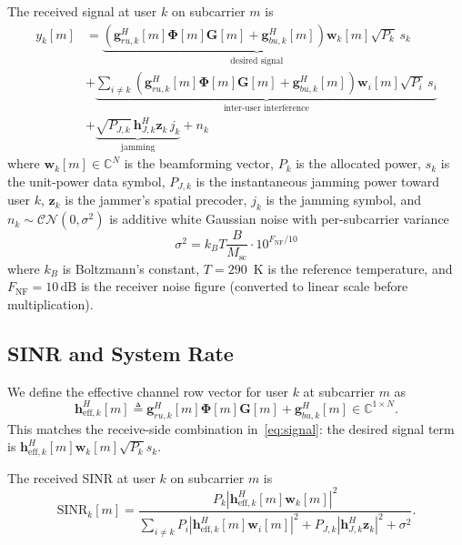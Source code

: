 \documentclass[journal,twocolumn]{IEEEtran}
\newcommand{\vect}[1]{\mathbf{#1}}
\newcommand{\mat}[1]{\mathbf{#1}}
\newcommand{\C}{\mathbb{C}}
\begin{document}
The received signal at user $k$ on subcarrier $m$ is
\begin{align}
y_k[m] &= \underbrace{\left(\vect{g}_{ru,k}^H[m]\bm{\Phi}[m]\mat{G}[m] + \vect{g}_{bu,k}^H[m]\right)\vect{w}_k[m]\sqrt{P_k}\,s_k}_{\text{desired signal}} \nonumber\\
&+ \underbrace{\sum_{i \neq k}\left(\vect{g}_{ru,k}^H[m]\bm{\Phi}[m]\mat{G}[m] + \vect{g}_{bu,k}^H[m]\right)\vect{w}_i[m]\sqrt{P_i}\,s_i}_{\text{inter-user interference}} \nonumber\\
&+ \underbrace{\sqrt{P_{J,k}}\,\vect{h}_{J,k}^H\vect{z}_k\,j_k}_{\text{jamming}} + n_k \label{eq:signal}
\end{align}
where $\vect{w}_k[m] \in \C^{N}$ is the beamforming vector, $P_k$ is the allocated power, $s_k$ is the unit-power data symbol, $P_{J,k}$ is the instantaneous jamming power toward user $k$, $\vect{z}_k$ is the jammer's spatial precoder, $j_k$ is the jamming symbol, and $n_k \sim \mathcal{CN}(0, \sigma^2)$ is additive white Gaussian noise with per-subcarrier variance
\begin{equation}
\sigma^2 = k_B T \frac{B}{M_{\text{sc}}} \cdot 10^{F_{\text{NF}}/10}
\label{eq:noise}
\end{equation}
where $k_B$ is Boltzmann's constant, $T = 290$~K is the reference temperature, and $F_{\text{NF}} = 10\,\text{dB}$ is the receiver noise figure (converted to linear scale before multiplication).

\subsection{SINR and System Rate}

We define the effective channel row vector for user $k$ at subcarrier $m$ as
\begin{equation}
\vect{h}_{\text{eff},k}^H[m] \triangleq \vect{g}_{ru,k}^H[m]\bm{\Phi}[m]\mat{G}[m] + \vect{g}_{bu,k}^H[m] \in \C^{1 \times N}.
\label{eq:heff}
\end{equation}
This matches the receive-side combination in~\eqref{eq:signal}: the desired signal term is $\vect{h}_{\text{eff},k}^H[m]\vect{w}_k[m]\sqrt{P_k}s_k$.

The received SINR at user $k$ on subcarrier $m$ is
\begin{equation}
\text{SINR}_k[m] = \frac{P_k |\vect{h}_{\text{eff},k}^H[m]\vect{w}_k[m]|^2}{\displaystyle\sum_{i \neq k}P_i|\vect{h}_{\text{eff},k}^H[m]\vect{w}_i[m]|^2 + P_{J,k}|\vect{h}_{J,k}^H\vect{z}_k|^2 + \sigma^2}.
\label{eq:sinr}
\end{equation}
\end{document}
